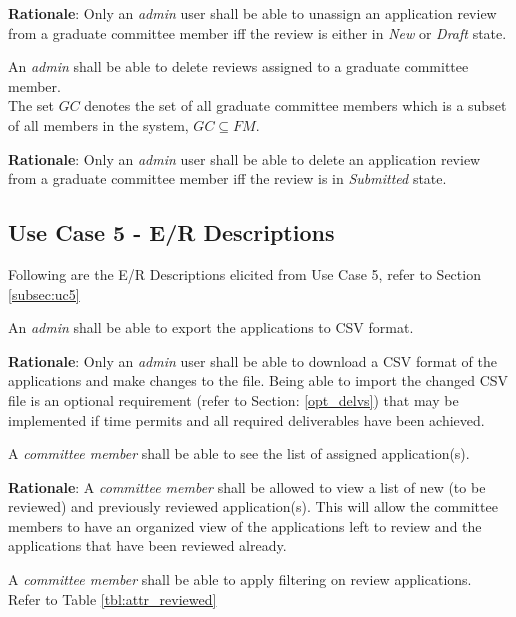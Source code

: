 \documentclass[fontsize=12pt,paper=letter,twoside]{scrartcl}
\begin{document}
\smallskip
\noindent \textbf{Rationale}: Only an \emph{admin} user shall be able to unassign an application review from a graduate committee member iff the review is either in \emph{New} or \emph{Draft} state.

\rdescription
{An \emph{admin} shall be able to delete reviews assigned to a graduate committee member.\\}
{The set $GC$ denotes the set of all graduate committee members which is a subset of all members in the system, $GC \subseteq FM$.}

\smallskip
\noindent \textbf{Rationale}: Only an \emph{admin} user shall be able to delete an application review from a graduate committee member iff the review is in \emph{Submitted} state.


\subsection{Use Case 5 - E/R Descriptions}

Following are the E/R Descriptions elicited from Use Case 5, refer to Section \ref{subsec:uc5}

\genreq
{An \emph{admin} shall be able to export the applications to CSV format.\\}
{}
\label{R14}

\smallskip
\noindent \textbf{Rationale}: Only an \emph{admin} user shall be able to download a CSV format of the applications and make changes to the file. Being able to import the changed CSV file is an optional requirement (refer to Section: \ref{opt_delvs}) that may be implemented if time permits and all required deliverables have been achieved.

\genreq
{A \emph{committee member} shall be able to see the list of assigned application(s).\\}
{}
\label{R15}

\smallskip
\noindent \textbf{Rationale}: A \emph{committee member} shall be allowed to view a list of new (to be reviewed) and previously reviewed application(s). This will allow the committee members to have an organized view of the applications left to review and the applications that have been reviewed already.

\rdescription
{A \emph{committee member} shall be able to apply filtering on review applications.\\}
{Refer to Table \ref{tbl:attr_reviewed}}
\label{R16}
\end{document}
